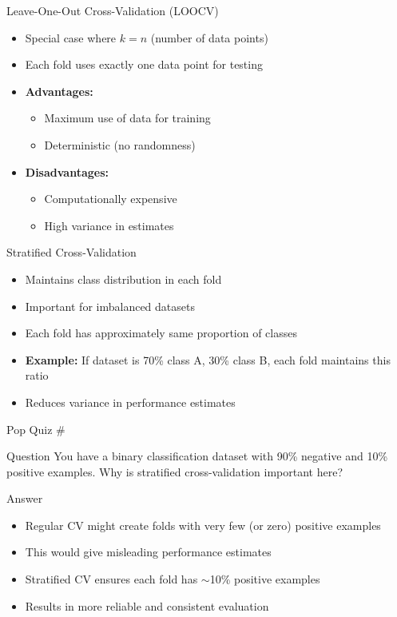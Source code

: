 \documentclass[usenames,dvipsnames]{beamer}
\newcounter{popquiz}
\begin{document}
\begin{frame}{Leave-One-Out Cross-Validation (LOOCV)}
\begin{itemize}
	\item \pause Special case where $k = n$ (number of data points)
	\item \pause Each fold uses exactly one data point for testing
	\item \pause \textbf{Advantages:}
	\begin{itemize}
		\item Maximum use of data for training
		\item Deterministic (no randomness)
	\end{itemize}
	\item \pause \textbf{Disadvantages:}
	\begin{itemize}
		\item Computationally expensive
		\item High variance in estimates
	\end{itemize}
\end{itemize}
\end{frame}

\begin{frame}{Stratified Cross-Validation}
\begin{itemize}
	\item \pause Maintains class distribution in each fold
	\item \pause Important for imbalanced datasets
	\item \pause Each fold has approximately same proportion of classes
	\item \pause \textbf{Example:} If dataset is 70\% class A, 30\% class B, each fold maintains this ratio
	\item \pause Reduces variance in performance estimates
\end{itemize}
\end{frame}

\begin{frame}{Pop Quiz \#\thepopquiz}
\begin{block}{Question}
You have a binary classification dataset with 90\% negative and 10\% positive examples. Why is stratified cross-validation important here?
\end{block}
\pause
\begin{block}{Answer}
\begin{itemize}
	\item Regular CV might create folds with very few (or zero) positive examples
	\item This would give misleading performance estimates
	\item Stratified CV ensures each fold has $\sim$10\% positive examples
	\item Results in more reliable and consistent evaluation
\end{itemize}
\end{block}
\end{frame}
\end{document}
